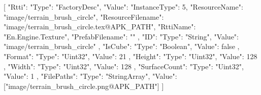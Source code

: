 [{
        "Rtti": {
            "Type": "FactoryDesc",
            "Value": {
                "InstanceType": 5,
                "ResourceName": "image/terrain_brush_circle",
                "ResourceFilename": "image/terrain_brush_circle.tex@APK_PATH",
                "RttiName": "En.Engine.Texture",
                "PrefabFilename": ""
            }
        },
        "ID": {
            "Type": "String",
            "Value": "image/terrain_brush_circle"
        },
        "IsCube": {
            "Type": "Boolean",
            "Value": false
        },
        "Format": {
            "Type": "Uint32",
            "Value": 21
        },
        "Height": {
            "Type": "Uint32",
            "Value": 128
        },
        "Width": {
            "Type": "Uint32",
            "Value": 128
        },
        "SurfaceCount": {
            "Type": "Uint32",
            "Value": 1
        },
        "FilePaths": {
            "Type": "StringArray",
            "Value": ["image/terrain_brush_circle.png@APK_PATH"]
        }
    }]